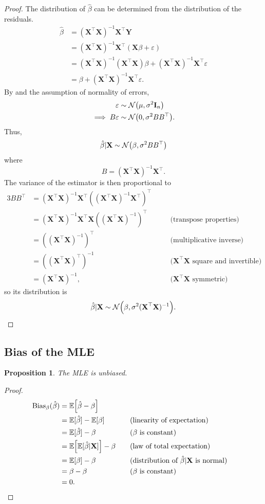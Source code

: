 \documentclass[letterpaper, reqno]{amsart}
\newtheorem{prop}{Proposition}[section]
\numberwithin{equation}{section}
\newcommand{\T}{\top} %
\newcommand{\vect}[1]{\boldsymbol{\mathbf{#1}}} %
\newcommand{\E}[1]{\mathbb{E}\mleft[#1\mright]}
\newcommand{\N}[2]{\mathcal{N}\mleft( #1, #2 \mright)}
\newcommand{\by}[1]{&\quad&\text{(#1)}}
\newcommand{\Xm}{\vect{X}}
\newcommand{\Yv}{\vect{Y}}
\newcommand{\Bv}{\beta}
\newcommand{\Bvh}{\hat{\beta}}
\newcommand{\ve}{\varepsilon}
\newcommand{\Ebh}{\mathbb{E}[\Bvh]}
\begin{document}
\begin{proof}
  The distribution of $\Bvh$ can be determined from the distribution of the
  residuals.
  \begin{align*}
    \Bvh &= (\Xm^\T \Xm)^{-1} \Xm^\T \Yv \\
        &= (\Xm^\T \Xm)^{-1} \Xm^\T (\Xm \Bv + \ve) \\
        &= (\Xm^\T \Xm)^{-1} (\Xm^\T \Xm) \Bv 
          + (\Xm^\T \Xm)^{-1} \Xm^\T \ve \\
        &= \Bv + (\Xm^\T \Xm)^{-1} \Xm^\T \ve.
  \end{align*}
  By  and the assumption of normality of errors,
  \begin{align*}
    \ve &\sim \N{\mu}{\sigma^2 \vect{I}_n} \\
    \implies B\ve &\sim \N{0}{\sigma^2 B B^\T}.
  \end{align*}
  Thus,
    \[ \Bvh|\Xm \sim \N{\Bv}{\sigma^2 B B^\T} \]
  where
  \[ B = (\Xm^\T \Xm)^{-1} \Xm^\T. \]
  The variance of the estimator is then proportional to
  \begin{alignat*}{3}
    B B^\T &= (\Xm^\T \Xm)^{-1} \Xm^\T ((\Xm^\T \Xm)^{-1} \Xm^\T)^\T  \\
          &= (\Xm^\T \Xm)^{-1} \Xm^\T \Xm ((\Xm^\T \Xm)^{-1})^\T  \by{transpose properties} \\
          &= ((\Xm^\T \Xm)^{-1})^\T \by{multiplicative inverse} \\
          &= ((\Xm^\T \Xm)^\T)^{-1} \by{$\Xm^\T\Xm$ square and invertible} \\
          &= (\Xm^\T \Xm)^{-1}, \by{$\Xm^\T\Xm$ symmetric}
  \end{alignat*}
  so its distribution is
  \[ \Bvh|\Xm \sim \N{\Bv}{ \sigma^2 (\Xm^\T \Xm)^{-1}}. \qedhere \]
\end{proof}

\subsection{Bias of the MLE}
\begin{prop}
  The MLE is unbiased.
\end{prop}

\begin{proof}
  \begin{alignat*}{3}
    \mathrm{Bias}_\Bv(\Bvh) &= \E{\Bvh - \Bv} \\
    &= \Ebh - \E{\Bv} \by{linearity of expectation} \\
    &= \Ebh - \Bv \by{$\Bv$ is constant} \\
    &= \E{\mathbb{E}[\Bvh|\Xm]} - \Bv \by{law of total expectation} \\
    &= \E{\Bv} - \Bv \by{distribution of $\Bvh|\Xm$ is normal} \\
    &= \Bv - \Bv \by{$\Bv$ is constant} \\
    &= 0. \tag*{\qedhere}
  \end{alignat*}
\end{proof}
\end{document}
